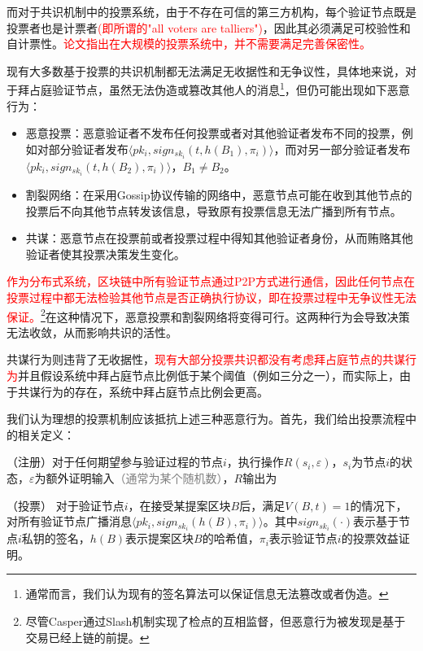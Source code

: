 而对于共识机制中的投票系统，由于不存在可信的第三方机构，每个验证节点既是投票者也是计票者\textcolor{red}{(即所谓的"all voters are talliers")}，因此其必须满足可校验性和自计票性。\textcolor{red}{论文\cite{kiayias2002self}指出在大规模的投票系统中，并不需要满足完善保密性。}

现有大多数基于投票的共识机制都无法满足无收据性和无争议性，具体地来说，对于拜占庭验证节点，虽然无法伪造或篡改其他人的消息\footnote{通常而言，我们认为现有的签名算法可以保证信息无法篡改或者伪造。}，但仍可能出现如下恶意行为：

\begin{itemize}
	\item 恶意投票：恶意验证者不发布任何投票或者对其他验证者发布不同的投票，例如对部分验证者发布$\langle pk_i,sign_{sk_i}(t,h(B_1),\pi_i) \rangle$，而对另一部分验证者发布$\langle pk_i,sign_{sk_i}(t,h(B_2),\pi_i) \rangle$，$B_1 \neq B_2$。
	\item 割裂网络：在采用Gossip协议传输的网络中，恶意节点可能在收到其他节点的投票后不向其他节点转发该信息，导致原有投票信息无法广播到所有节点。
	\item 共谋：恶意节点在投票前或者投票过程中得知其他验证者身份，从而贿赂其他验证者使其投票决策发生变化。
\end{itemize}

\textcolor{red}{作为分布式系统，区块链中所有验证节点通过P2P方式进行通信，因此任何节点在投票过程中都无法检验其他节点是否正确执行协议，即在投票过程中无争议性无法保证。}\footnote{尽管Casper通过Slash机制实现了检点的互相监督，但恶意行为被发现是基于交易已经上链的前提。}在这种情况下，恶意投票和割裂网络将变得可行。这两种行为会导致决策无法收敛，从而影响共识的活性。%

共谋行为则违背了无收据性，\textcolor{red}{现有大部分投票共识都没有考虑拜占庭节点的共谋行为}并且假设系统中拜占庭节点比例低于某个阈值（例如三分之一），而实际上，由于共谋行为的存在，系统中拜占庭节点比例会更高。

我们认为理想的投票机制应该抵抗上述三种恶意行为。首先，我们给出投票流程中的相关定义：

\begin{definition}
	（注册）对于任何期望参与验证过程的节点$i$，执行操作$R(s_i,\varepsilon)$，$s_i$为节点$i$的状态，$\varepsilon$为额外证明输入\textcolor{gray}{（通常为某个随机数）}，$R$输出为
\end{definition}

\begin{definition}
（投票） 对于验证节点$i$，在接受某提案区块$B$后，满足$V(B,t)=1$的情况下，对所有验证节点广播消息$\langle pk_i,sign_{sk_i}(h(B),\pi_i) \rangle$。其中$sign_{sk_i}(\cdot)$表示基于节点$i$私钥的签名，$h(B)$表示提案区块$B$的哈希值，$\pi_i$表示验证节点$i$的投票效益证明。
\end{definition}

